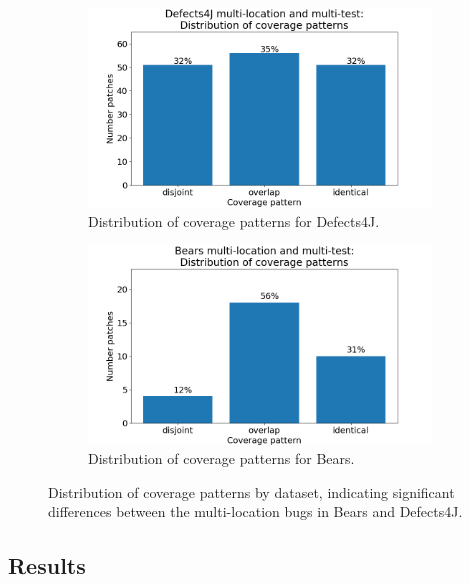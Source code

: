 \documentclass[10pt, conference]{IEEEtran}
\begin{document}
\begin{figure}
	\begin{subfigure}{\linewidth}
		\includegraphics[width=\linewidth]{img/coverage-d4j.png}
		\caption{Distribution of coverage patterns for Defects4J.}
	\end{subfigure}

\vspace{0.5cm}

	\begin{subfigure}{\linewidth}
		\includegraphics[width=\linewidth]{img/coverage-bears.png}
		\caption{Distribution of coverage patterns for Bears.}
	\end{subfigure}
	\caption{Distribution of coverage patterns by dataset,
          indicating significant differences between the multi-location bugs in
          Bears and Defects4J.}
	\label{fig:coverage-datasets}
\end{figure}

\subsection{Results}
\end{document}
